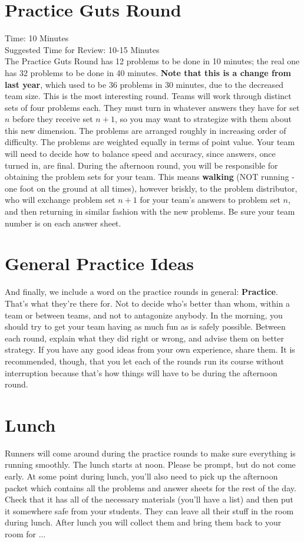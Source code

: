 \documentclass[11pt]{article}
\begin{document}
\begin{small}
\section{Practice Guts Round}
\noindent Time: 10 Minutes \\
\noindent Suggested Time for Review: 10-15 Minutes\\
\noindent The Practice Guts Round has 12 problems to be done in 10 minutes; the real one has 32 problems to be done in 40 minutes. \textbf{Note that this is a change from last year}, which used to be 36 problems in 30 minutes, due to the decreased team size. This is the most interesting round. Teams will work through distinct sets of four problems each. They must turn in whatever answers they have for set $n$ before they receive set $n+1$, so you may want to strategize with them about this new dimension. The problems are arranged roughly in increasing order of difficulty. The problems are weighted equally in terms of point value. Your team will need to decide how to balance speed and accuracy, since answers, once turned in, are final.  During the afternoon round, you will be responsible for obtaining the problem sets for your team. This means \textbf{walking} (NOT running - one foot on the ground at all times), however briskly, to the problem distributor, who will exchange problem set $n + 1$ for your team's answers to problem set $n$, and then returning in similar fashion with the new problems. Be sure your team number is on each answer sheet.

\section{General Practice Ideas}
\noindent And finally, we include a word on the practice rounds in general: \textbf{Practice}. That's what they're there for. Not to decide who's better than whom, within a team or between teams, and not to antagonize anybody. In the morning, you should try to get your team having as much fun as is safely possible. Between each round, explain what they did right or wrong, and advise them on better strategy. If you have any good ideas from your own experience, share them. It is recommended, though, that you let each of the rounds run its course without interruption because that's how things will have to be during the afternoon round.

\section{Lunch}
\noindent Runners will come around during the practice rounds to make sure everything is running smoothly. The lunch starts at noon. Please be prompt, but do not come early. At some point during lunch, you'll also need to pick up the afternoon packet which contains all the problems and answer sheets for the rest of the day. Check that it has all of the necessary materials (you'll have a list) and then put it somewhere safe from your students. They can leave all their stuff in the room during lunch. After lunch you will collect them and bring them back to your room for ...


\end{small}
\end{document}
